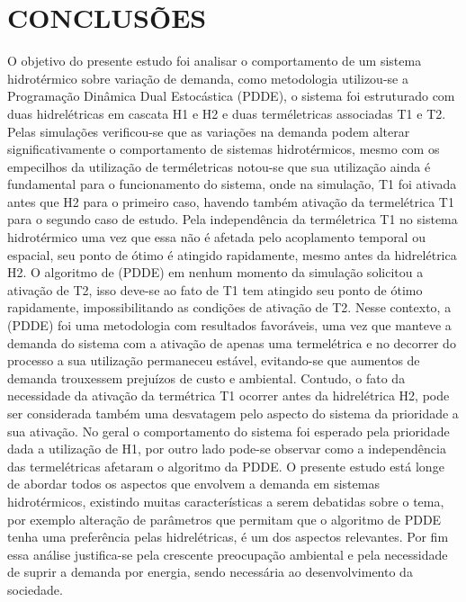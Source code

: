 \documentclass[12pt,fleqn]{article}
\begin{document}
\section{CONCLUS\~OES}
O objetivo do presente estudo foi analisar o comportamento de um sistema hidrot\'ermico sobre varia\c c\~ao de demanda,
como metodologia utilizou-se a Programa\c c\~ao Din\^amica Dual Estoc\'astica (PDDE), o sistema foi
estruturado com duas hidrel\'etricas em cascata H1 e H2 e duas term\'eletricas associadas T1 e T2. Pelas simula\c c\~oes
verificou-se que as varia\c c\~oes na demanda podem alterar significativamente o comportamento de sistemas hidrot\'ermicos, mesmo com
os empecilhos da utiliza\c c\~ao de term\'eletricas notou-se que sua utiliza\c c\~ao ainda \'e fundamental para o
funcionamento do sistema, onde na simula\c c\~ao, T1 foi ativada antes que H2 para o primeiro caso, havendo
tamb\'em ativa\c c\~ao da termel\'etrica T1 para o segundo caso de estudo. Pela independ\^encia da term\'eletrica T1 no
sistema hidrot\'ermico uma vez que essa n\~ao \'e afetada pelo acoplamento temporal ou espacial, seu ponto de \'otimo
\'e atingido rapidamente, mesmo antes da hidrel\'etrica H2. O algoritmo de (PDDE) em nenhum momento da  simula\c c\~ao
solicitou a ativa\c c\~ao de T2, isso deve-se ao fato de T1 tem atingido seu ponto de \'otimo rapidamente,
impossibilitando as condi\c c\~oes de ativa\c c\~ao de T2. Nesse
 contexto, a (PDDE) foi uma metodologia com resultados favor\'aveis, uma vez que manteve a demanda do sistema com a
 ativa\c c\~ao de apenas uma termel\'etrica e no decorrer do processo a sua utiliza\c c\~ao permaneceu est\'avel,
 evitando-se que aumentos de demanda trouxessem preju\'izos de custo e ambiental. Contudo, o fato da necessidade da
 ativa\c c\~ao da term\'etrica T1 ocorrer antes da hidrel\'etrica H2, pode ser considerada tamb\'em uma desvatagem
 pelo aspecto do sistema da prioridade a sua ativa\c c\~ao. No geral o comportamento  do sistema foi esperado pela
 prioridade dada a utiliza\c c\~ao de H1, por outro lado pode-se observar como a independ\^encia das termel\'etricas
 afetaram o algoritmo da PDDE. O presente estudo est\'a longe de abordar todos os aspectos que envolvem a demanda em
 sistemas hidrot\'ermicos, existindo muitas caracter\'isticas a serem debatidas sobre o tema, por exemplo altera\c
 c\~ao de par\^ametros que permitam que o algoritmo de PDDE tenha uma prefer\^encia
 pelas hidrel\'etricas, \'e um dos aspectos relevantes. Por fim essa an\'alise justifica-se pela crescente preocupa\c c\~ao
 ambiental e pela necessidade de suprir a demanda por energia, sendo necess\'aria ao desenvolvimento da sociedade.
\end{document}
